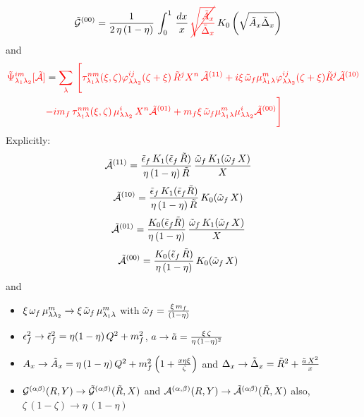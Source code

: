 \documentclass[9pt]{article}
\newcommand{\chg}[1]{{\color{red}#1}}
\newcommand{\del}[1]{{\color{red}\cancel{#1}}}
\numberwithin{equation}{section}
\begin{document}
\begin{align}
     \mathcal{\Tilde{G}}^{(00)} & = \frac{1}{2\, \eta\, (1-\eta)}\, \int_{0}^{1}\, \frac{dx}{x}\, \del{\sqrt{\frac{\Tilde{A}_{x}}{\Tilde{\Delta}_{x}}}}\, K_{0}\left(\sqrt{\Tilde{A}_{x}\Tilde{\Delta}_{x}}\right)
\label{chg:G00qb}\end{align}
and
\begin{align}
  \chg{\Tilde{\Psi}^{im}_{\lambda_{1}\lambda_{2}}[\mathcal{\Tilde{A}}]} & = \chg{\sum_{\lambda}\, \Bigg[\tau^{nm}_{\lambda_{1}\lambda}(\xi,\zeta)\varphi^{ij}_{\lambda\lambda_{2}}(\zeta + \xi)\,\Tilde{R}^{j}X^{n}\,\mathcal{\Tilde{A}}^{(11)}+i\xi\,\Tilde{\omega}_{f}\mu^{m}_{\lambda_{1}\lambda}\varphi^{ij}_{\lambda\lambda_{2}}(\zeta + \xi)\Tilde{R}^{j}\mathcal{\Tilde{A}}^{(10)}}\notag \\ & \chg{-im_{f}\,\tau^{nm}_{\lambda_{1}\lambda}(\xi,\zeta)\,\mu^{i}_{\lambda\lambda_{2}}\,X^{n}\mathcal{\Tilde{A}}^{(01)} + m_{f}\xi\,\Tilde{\omega}_{f}\mu^{m}_{\lambda_{1}\lambda}\mu^{i}_{\lambda\lambda_{2}}\mathcal{\Tilde{A}}^{(00)}\Bigg]}
\label{chg:Psiq}\end{align}
\label{chg:ty3e}\chg{Explicitly}: 
\begin{align}
    \mathcal{\Tilde{A}}^{(11)} & = \frac{\Tilde{\epsilon}_{f}\,K_{1}(\Tilde{\epsilon}_{f}\,\Tilde{R})}{\eta\,(1-\eta)\,\Tilde{R}}\, \frac{\Tilde{\omega}_{f}\,K_{1}(\Tilde{\omega}_{f}\,X)}{X}
\end{align}
\begin{align}
    \mathcal{\Tilde{A}}^{(10)} & = \frac{\Tilde{\epsilon}_{f}\,K_{1}(\Tilde{\epsilon}_{f}\Tilde{R})}{\eta\,(1-\eta)\,\Tilde{R}}\, K_{0}(\Tilde{\omega}_{f}\,X)
\end{align}
\begin{align}
    \mathcal{\Tilde{A}}^{(01)} & =   \frac{K_{0}(\Tilde{\epsilon}_{f}\Tilde{R})}{\eta\,(1-\eta)}\,\frac{\Tilde{\omega}_{f}\,K_{1}(\Tilde{\omega}_{f}\,X)}{X}
\end{align}
\begin{align}
    \mathcal{\Tilde{A}}^{(00)} & = \frac{K_{0}(\Tilde{\epsilon}_{f}\,\Tilde{R})}{\eta\,(1-\eta)}\, K_{0}(\Tilde{\omega}_{f}\,X)
\end{align}
and 
\begin{itemize}
 \item $\xi\, \omega_{f}\,\mu^{m}_{\lambda\lambda_{2}} \rightarrow \xi\, \Tilde{\omega}_{f}\,\mu^{m}_{\lambda_{1}\lambda}$ with $\Tilde{\omega}_{f} = \frac{\xi\,m_{f}}{(1-\eta)}$
    \item $\epsilon^{2}_{f} \rightarrow \Tilde{\epsilon}^{2}_{f} = \eta(1-\eta)\, Q^{2} + m^{2}_{f}$, $a \rightarrow \Tilde{a} = \frac{\xi\,\zeta}{\eta\, (1-\eta)^{2}}$
    \item $A_{x} \rightarrow \Tilde{A}_{x} = \eta\,(1-\eta)\,Q^{2} + m^{2}_{f}\left(1+\frac{x\eta\xi}{\zeta}\right)$ and $\Delta_{x} \rightarrow \Tilde{\Delta}_{x} = \Tilde{R}^{2} + \frac{\Tilde{a}\,X^{2}}{x}$
    \item $\mathcal{G}^{(\alpha\beta)}(R,Y) \rightarrow \mathcal{\Tilde{G}}^{(\alpha\beta)}(\Tilde{R},X) $ and $\mathcal{A}^{(\alpha,\beta)}(R,Y) \rightarrow \mathcal{\Tilde{A}}^{(\alpha\beta)}(\Tilde{R},X)$ also, $\zeta\,(1-\zeta) \rightarrow \eta\,(1-\eta)$
\end{itemize}
\end{document}
